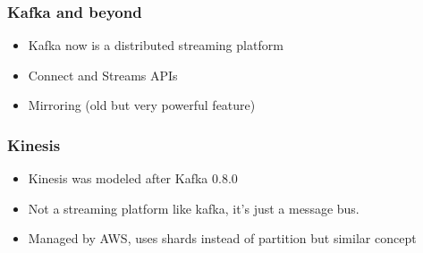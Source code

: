 \documentclass[12pt]{beamer}
\begin{document}
        \begin{frame}
            \begin{center}
                \frametitle{Kafka and beyond}
                \begin{itemize}
                    \item Kafka now is a distributed streaming platform
                    \item Connect and Streams APIs
                    \item Mirroring (old but very powerful feature)
                \end{itemize}
            \end{center}
        \end{frame}

        \begin{frame}
            \begin{center}
                \frametitle{Kinesis}
                \begin{itemize}
                    \item Kinesis was modeled after Kafka 0.8.0
                    \item Not a streaming platform like kafka, it's just a message bus.
                    \item Managed by AWS, uses shards instead of partition but similar concept
                \end{itemize}
            \end{center}
        \end{frame}
     
    
\end{document}
